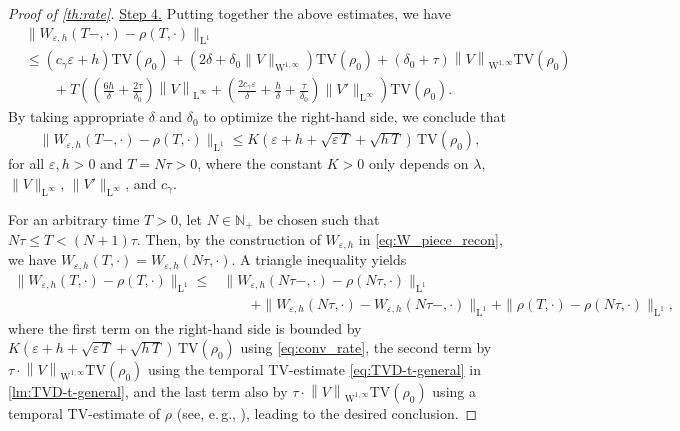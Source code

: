 \documentclass[10pt]{amsart}
\theoremstyle{plain}
\theoremstyle{definition}
\numberwithin{equation}{section}
\newcommand{\N}{\mathbb{N}}
\newcommand{\eps}{{\varepsilon}}
\newcommand{\norm}[1]{\left\lVert#1\right\rVert}
\begin{document}
\begin{proof}[Proof of \cref{th:rate}]
\uline{Step 4.} Putting together the above estimates, we have
\begin{align*}
&\|W_{\eps,h}(T-,\cdot)-\rho(T,\cdot)\|_{\mathrm{L}^1} \\
&\leq  (c_\gamma\eps+h) \mathrm{TV}(\rho_0) + \left(2 \delta+\delta_0\|V\|_{\mathrm{W}^{1,\infty}}\right) \mathrm{TV}(\rho_0) + (\delta_0+\tau) \norm{V}_{\mathrm{W}^{1,\infty}} \mathrm{TV}(\rho_0) \\
&\qquad + T \left( \left(\frac{6h}{\delta}+\frac{2\tau}{\delta_0}\right) \norm{V}_{\mathrm{L}^{\infty}} + \left(\frac{2c_\gamma\eps}{\delta}+\frac{h}{\delta}+\frac{\tau}{\delta_0}\right)\|V'\|_{\mathrm{L}^\infty}\right) \mathrm{TV}(\rho_0).
\end{align*}
By taking appropriate $\delta$ and $\delta_0$ to optimize the right-hand side, we conclude that
\begin{align}\label{eq:conv_rate}
    \|W_{\eps,h}(T-,\cdot)-\rho(T,\cdot)\|_{\mathrm{L}^1} \leq K\left( \eps+h+\sqrt{\eps\, T}+\sqrt{h\,T} \right)\, \mathrm{TV}(\rho_0),
\end{align}
for all $\eps,h>0$ and $T=N\tau>0$, where the constant $K>0$ only depends on $\lambda$, $\|V\|_{\mathrm{L}^\infty}$, $\|V'\|_{\mathrm{L}^\infty}$, and $c_\gamma$.

For an arbitrary time $T>0$, let $N\in\N_+$ be chosen such that $N\tau\le T<(N+1)\tau$. Then, by the construction of $W_{\eps,h}$ in \cref{eq:W_piece_recon}, we have $W_{\eps,h}(T,\cdot)=W_{\eps,h}(N\tau,\cdot)$. A triangle inequality yields
\begin{align*}
\|W_{\eps,h}(T,\cdot)-\rho(T,\cdot)\|_{\mathrm{L}^1} \leq& \|W_{\eps,h}(N\tau-,\cdot)-\rho(N\tau,\cdot)\|_{\mathrm{L}^1} \\
&\qquad + \|W_{\eps,h}(N\tau,\cdot)-W_{\eps,h}(N\tau-,\cdot)\|_{\mathrm{L}^1} + \|\rho(T,\cdot)-\rho(N\tau,\cdot)\|_{\mathrm{L}^1},
\end{align*}
where the first term on the right-hand side is bounded by $K\left( \eps+h+\sqrt{\eps\, T}+\sqrt{h\,T} \right)\, \mathrm{TV}(\rho_0)$ using \cref{eq:conv_rate}, the second term by $\tau\cdot\norm{V}_{\mathrm{W}^{1,\infty}} \mathrm{TV}(\rho_0)$ using the temporal TV-estimate \cref{eq:TVD-t-general} in \cref{lm:TVD-t-general}, and the last term also by $\tau\cdot\norm{V}_{\mathrm{W}^{1,\infty}} \mathrm{TV}(\rho_0)$ using a temporal TV-estimate of $\rho$ (see, e.\,g., \cite[Lemma 7.5]{MR4789921}), leading to the desired conclusion.

\end{proof}
\end{document}
